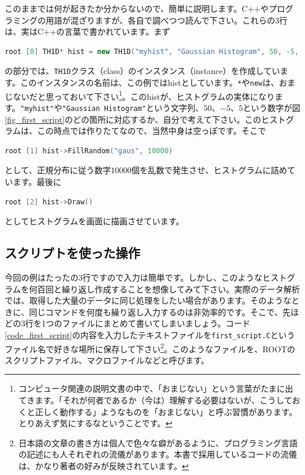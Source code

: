 このままでは何が起きたか分からないので、簡単に説明します。C++やプログラミングの用語が混ざりますが、各自で調べつつ読んで下さい。これらの3行は、実はC++の言葉で書かれています。まず
\begin{lstlisting}[language=c++]
root [0] TH1D* hist = new TH1D("myhist", "Gaussian Histogram", 50, -5, 5)
\end{lstlisting}
の部分では、\texttt{TH1D}クラス（class）のインスタンス（instance）を作成しています。このインスタンスの名前は、この例ではhistとしています。\texttt{*}や\texttt{new}は、おまじないだと思っておいて下さい\footnote{コンピュータ関連の説明文書の中で、「おまじない」という言葉がたまに出てきます。「それが何者であるか（今は）理解する必要はないが、こうしておくと正しく動作する」ようなものを「おまじない」と呼ぶ習慣があります。とりあえず気にするなということです。}。このhistが、ヒストグラムの実体になります。\texttt{"myhist"}や\texttt{"Gaussian Histogram"}という文字列、$50$、$-5$、$5$という数字が図\ref{fig_first_script}のどの箇所に対応するか、自分で考えて下さい。このヒストグラムは、この時点では作りたてなので、当然中身は空っぽです。そこで
\begin{lstlisting}[language=c++]
root [1] hist->FillRandom("gaus", 10000)
\end{lstlisting}
として、正規分布に従う数字$10000$個を乱数で発生させ、ヒストグラムに詰めています。最後に
\begin{lstlisting}[language=c++]
root [2] hist->Draw()
\end{lstlisting}
としてヒストグラムを画面に描画させています。

\subsection{スクリプトを使った操作}
今回の例はたったの3行ですので入力は簡単です。しかし、このようなヒストグラムを何百回と繰り返し作成することを想像してみて下さい。実際のデータ解析では、取得した大量のデータに同じ処理をしたい場合があります。そのようなときに、同じコマンドを何度も繰り返し入力するのは非効率的です。そこで、先ほどの3行を1つのファイルにまとめて書いてしまいましょう。コード\ref{code_first_script}の内容を入力したテキストファイルを\texttt{first\_script.C}というファイル名で好きな場所に保存して下さい\footnote{日本語の文章の書き方は個人で色々な癖があるように、プログラミング言語の記述にも人それぞれの流儀があります。本書で採用しているコードの流儀は、かなり著者の好みが反映されています。}。このようなファイルを、ROOTのスクリプトファイル、マクロファイルなどと呼びます。


